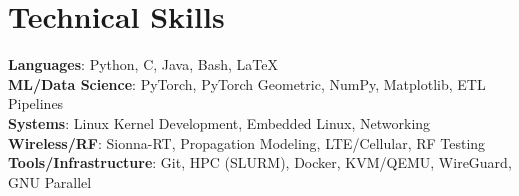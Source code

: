 \documentclass[letterpaper,11pt]{article}
\begin{document}
%
 \section{Technical Skills}
 \begin{itemize}[leftmargin=0.15in, label={}]
    \small{\item{
     \textbf{Languages}{: Python, C, Java, Bash, \LaTeX} \\
     \textbf{ML/Data Science}{: PyTorch, PyTorch Geometric, NumPy, Matplotlib, ETL Pipelines} \\
     \textbf{Systems}{: Linux Kernel Development, Embedded Linux, Networking} \\
     \textbf{Wireless/RF}{: Sionna-RT, Propagation Modeling, LTE/Cellular, RF Testing} \\
     \textbf{Tools/Infrastructure}{: Git, HPC (SLURM), Docker, KVM/QEMU, WireGuard, GNU Parallel}
    }}
 \end{itemize}

\end{document}
